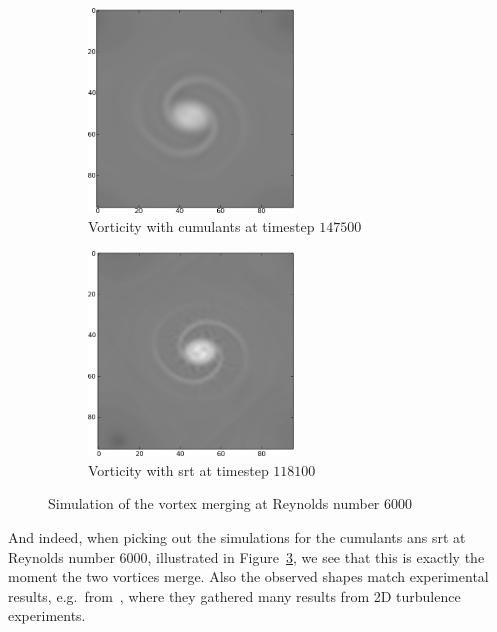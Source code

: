 \begin{figure}
    \medskip
    \begin{subfigure}[b]{.5\textwidth}
      \centering
      \includegraphics[width=0.6\textwidth]{../figures/cumulant_Re6000_size96_1475.png}  %
      \caption{Vorticity with cumulants at timestep $147500$}
\label{fig: rankine cumulant}
    \end{subfigure}\begin{subfigure}[b]{.5\textwidth}
    \centering
    \includegraphics[width=0.6\textwidth]{../figures/srt_Re6000_size96_1181.png}  %
    \caption{Vorticity with \gls{srt} at timestep $118100$}
\label{fig: rankine srt}
  \end{subfigure}
  \caption{Simulation of the vortex merging at Reynolds number $6000$}
\label{fig: rankine 6000}
\end{figure}
And indeed, when picking out the simulations for the cumulants ans \gls{srt} at Reynolds number $6000$, illustrated in Figure~\ref{fig: rankine 6000}, we see that this is exactly the moment the two vortices merge.
Also the observed shapes match experimental results, e.g.\ from~\cite{tabeling2002two}, where they gathered many results from 2D turbulence experiments.
